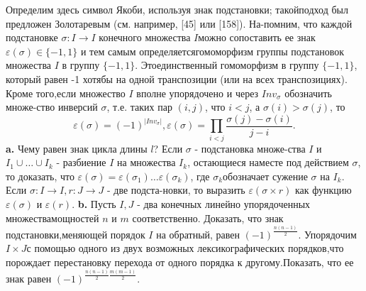\documentclass{mai_book}
\begin{document}
	Определим здесь символ Якоби, используя знак подстановки; такой\newline подход был предложен Золотаревым (см. например, [45] или [158]). На-\newline помним, что каждой подстановке $\sigma : I\rightarrow I$ конечного множества $I$\newline можно сопоставить ее знак $\varepsilon(\sigma)\in \lbrace -1, 1\rbrace$ и тем самым определяется\newline гомоморфизм группы подстановок множества $I$ в группу $\lbrace -1, 1 \rbrace$. Это\newline единственный гомоморфизм в группу $\lbrace -1, 1 \rbrace$, который равен -1 хотя\newline бы на одной транспозиции (или на всех транспозициях). Кроме того,\newline если множество $I$ вполне упорядочено и через ${Inv}_\sigma$ обозначить множе-\newline ство инверсий $\sigma$, т.е. таких пар $(i,j)$, что $i<j$, а $\sigma(i)>\sigma(j)$, то
$$
\varepsilon(\sigma)={(-1)}^{\vert{Inv}_\sigma\vert},
\varepsilon(\sigma)=\prod\limits_{i<j}\dfrac{\sigma(j)-\sigma(i)}{j-i}.
$$
\hspace*{15pt}\textbf{a.} Чему равен знак цикла длины $l$? Если $\sigma$ - подстановка множе-\newline ства $I$ и $I_1\cup\ldots\cup I_k$ - разбиение $I$ на множества $I_k$, остающиеся на\newline месте под действием $\sigma$, то доказать, что $\varepsilon(\sigma)=\varepsilon(\sigma_1)\ldots\varepsilon(\sigma_k)$, где $\sigma_k$\newline обозначает сужение $\sigma$ на $I_k$. Если $\sigma : I \rightarrow I, r : J \rightarrow J$ - две подста-\newline новки, то выразить $\varepsilon(\sigma \times r)$ как функцию $\varepsilon(\sigma)$ и $\varepsilon(r)$.\newline
\hspace*{15pt}\textbf{b.} Пусть $I,J$ - два конечных линейно упорядоченных множества\newline мощностей $n$ и $m$ соответственно. Доказать, что знак подстановки,\newline меняющей порядок $I$ на обратный, равен ${(-1)}^{\frac{n(n-1)}{2}}$. Упорядочим $I \times J$\newline с помощью одного из двух возможных лексикографических порядков,\newline что порождает перестановку перехода от одного порядка к другому.\newline Показать, что ее знак равен ${(-1)}^{\frac{n(n-1)}{2}\frac{m(m-1)}{2}}.$\newline
\end{document}
